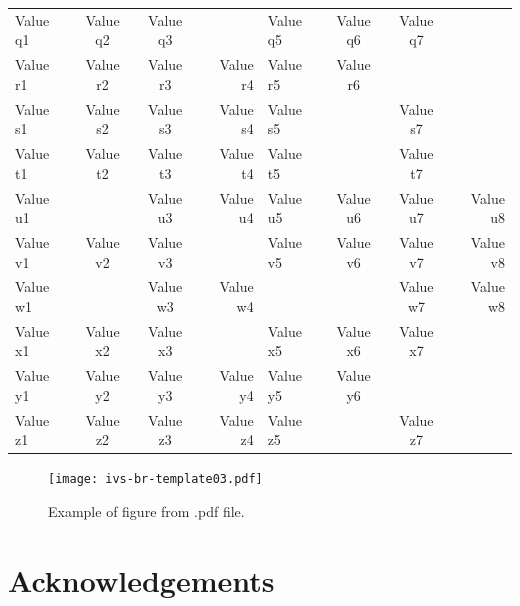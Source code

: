 \documentclass[twocolumn,twoside]{svmultivs_br} %
\begin{document}
\begin{table}[htb!]
\begin{center}
\begin{tabular}{|l|c|c|r|l|c|c|r|}
Value q1 & Value q2 & Value q3 &          & Value q5 & Value q6 & Value q7 &          \\
Value r1 & Value r2 & Value r3 & Value r4 & Value r5 & Value r6 &          &          \\
Value s1 & Value s2 & Value s3 & Value s4 & Value s5 &          & Value s7 &          \\
Value t1 & Value t2 & Value t3 & Value t4 & Value t5 &          & Value t7 &          \\
Value u1 &          & Value u3 & Value u4 & Value u5 & Value u6 & Value u7 & Value u8 \\
\hline
Value v1 & Value v2 & Value v3 &          & Value v5 & Value v6 & Value v7 & Value v8 \\
Value w1 &          & Value w3 & Value w4 &          &          & Value w7 & Value w8 \\
Value x1 & Value x2 & Value x3 &          & Value x5 & Value x6 & Value x7 &          \\
Value y1 & Value y2 & Value y3 & Value y4 & Value y5 & Value y6 &          &          \\
Value z1 & Value z2 & Value z3 & Value z4 & Value z5 &          & Value z7 &          \\
\hline
\end{tabular}
\end{center}
\label{fourth-unique-label}
\end{table}
%
%
\begin{figure}[htb!]
\begin{center}
\texttt{[image: ivs-br-template03.pdf]}
\end{center}
\caption{Example of figure from .pdf file.}
\label{fifth-unique-label}
\end{figure}
%
%
\section*{Acknowledgements}
\end{document}
